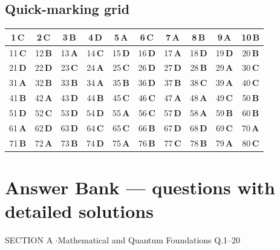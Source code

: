 \documentclass[11pt,a4paper]{article}
\begin{document}
\subsection*{Quick-marking grid}
\begin{center}\renewcommand{\arraystretch}{1.3}
\begin{tabular}{|c|c|c|c|c|c|c|c|c|c|}\hline
1\,\textbf{C} & 2\,\textbf{C} & 3\,\textbf{B} & 4\,\textbf{D} & 5\,\textbf{A} & 6\,\textbf{C} & 7\,\textbf{A} & 8\,\textbf{B} & 9\,\textbf{A} & 10\,\textbf{B} \\
\hline
11\,\textbf{C} & 12\,\textbf{B} & 13\,\textbf{A} & 14\,\textbf{C} & 15\,\textbf{D} & 16\,\textbf{D} & 17\,\textbf{A} & 18\,\textbf{D} & 19\,\textbf{D} & 20\,\textbf{B} \\
\hline
21\,\textbf{D} & 22\,\textbf{D} & 23\,\textbf{C} & 24\,\textbf{A} & 25\,\textbf{C} & 26\,\textbf{D} & 27\,\textbf{D} & 28\,\textbf{B} & 29\,\textbf{A} & 30\,\textbf{C} \\
\hline
31\,\textbf{A} & 32\,\textbf{B} & 33\,\textbf{B} & 34\,\textbf{A} & 35\,\textbf{B} & 36\,\textbf{D} & 37\,\textbf{B} & 38\,\textbf{C} & 39\,\textbf{A} & 40\,\textbf{C} \\
\hline
41\,\textbf{B} & 42\,\textbf{A} & 43\,\textbf{D} & 44\,\textbf{B} & 45\,\textbf{C} & 46\,\textbf{C} & 47\,\textbf{A} & 48\,\textbf{A} & 49\,\textbf{C} & 50\,\textbf{B} \\
\hline
51\,\textbf{D} & 52\,\textbf{C} & 53\,\textbf{D} & 54\,\textbf{D} & 55\,\textbf{A} & 56\,\textbf{C} & 57\,\textbf{D} & 58\,\textbf{A} & 59\,\textbf{B} & 60\,\textbf{B} \\
\hline
61\,\textbf{A} & 62\,\textbf{D} & 63\,\textbf{D} & 64\,\textbf{C} & 65\,\textbf{C} & 66\,\textbf{B} & 67\,\textbf{D} & 68\,\textbf{D} & 69\,\textbf{C} & 70\,\textbf{A} \\
\hline
71\,\textbf{B} & 72\,\textbf{A} & 73\,\textbf{B} & 74\,\textbf{D} & 75\,\textbf{A} & 76\,\textbf{B} & 77\,\textbf{C} & 78\,\textbf{B} & 79\,\textbf{A} & 80\,\textbf{C} \\
\hline\end{tabular}\end{center}
\newpage
\section*{Answer Bank --- questions with detailed solutions}\label{bank}

\begin{sectionbanner}SECTION A \enspace$\cdot$\enspace Mathematical and Quantum Foundations \hfill Q.1--20\end{sectionbanner}
\end{document}
